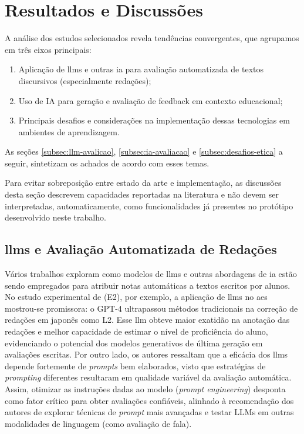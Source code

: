 \section{Resultados e Discussões}
A análise dos estudos selecionados revela tendências convergentes, que agrupamos em três eixos principais:

\begin{enumerate}
    \item Aplicação de \gls{llm}s e outras \gls{ia} para avaliação automatizada de textos discursivos (especialmente redações);
    \item Uso de IA para geração e avaliação de feedback em contexto educacional;
    \item Principais desafios e considerações na implementação dessas tecnologias em ambientes de aprendizagem.
\end{enumerate}

As seções \autoref{subsec:llm-avalicao}, \autoref{subsec:ia-avaliacao} e \autoref{subsec:desafios-etica} a seguir, sintetizam os achados de acordo com esses temas.

Para evitar sobreposição entre estado da arte e implementação, as discussões desta seção descrevem capacidades reportadas na literatura e não devem ser interpretadas, automaticamente, como funcionalidades já presentes no protótipo desenvolvido neste trabalho.

\subsection{\texorpdfstring{\gls{llm}}{LLM}s e Avaliação Automatizada de Redações}
\label{subsec:llm-avalicao}
Vários trabalhos exploram como modelos de \gls{llm}s e outras abordagens de \gls{ia} estão sendo empregados para atribuir notas automáticas a textos escritos por alunos. No estudo experimental de  (E2), por exemplo, a aplicação de \gls{llm}s no \gls{aes} mostrou-se promissora: o GPT-4 ultrapassou métodos tradicionais na correção de redações em japonês como L2. Esse \gls{llm} obteve maior exatidão na anotação das redações e melhor capacidade de estimar o nível de proficiência do aluno, evidenciando o potencial dos modelos generativos de última geração em avaliações escritas. Por outro lado, os autores ressaltam que a eficácia dos \gls{llm}s depende fortemente de \textit{prompts} bem elaborados, visto que estratégias de \textit{prompting} diferentes resultaram em qualidade variável da avaliação automática. Assim, otimizar as instruções dadas ao modelo (\textit{prompt engineering}) desponta como fator crítico para obter avaliações confiáveis, alinhado à recomendação dos autores de explorar técnicas de \textit{prompt} mais avançadas e testar LLMs em outras modalidades de linguagem (como avaliação de fala).

